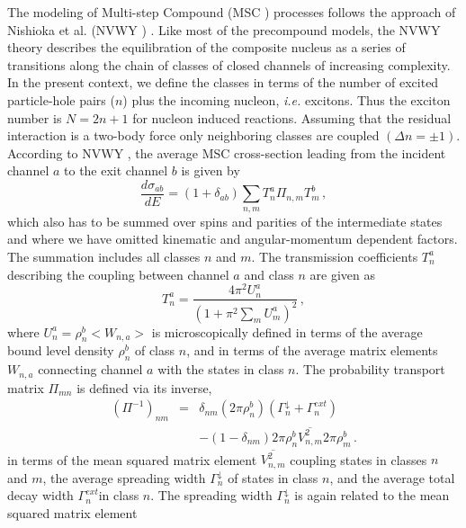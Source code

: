 The modeling of Multi-step Compound%
 (MSC%
) processes follows the approach of Nishioka et al. (NVWY%
) \cite{NVWY}. Like most of the precompound models, the NVWY
theory describes the equilibration of the composite nucleus as a series of
transitions along the chain of classes of closed channels of increasing
complexity. In the present context, we define the classes in terms of the
number of excited particle-hole pairs ($n$) plus the incoming nucleon,
\textit{i.e.} excitons. Thus the exciton number is $N=2n+1$ for nucleon
induced reactions. Assuming that the residual interaction is a two-body
force only neighboring classes are coupled $(\Delta n=\pm1)$. According to
NVWY%
, the average MSC%
 cross-section leading from the incident channel $a$ to the exit
channel $b$ is given by
\begin{equation}
\frac{d\sigma_{ab}}{dE}=(1+\delta_{ab})\sum_{n,m}T_{n}^{a}\Pi_{n,m}T_{m}^{b}%
\,,  \label{msccs}
\end{equation}
which also has to be summed over spins and parities of the intermediate
states and where we have omitted kinematic and angular-momentum dependent
factors. The summation includes all classes $n$ and $m$. The transmission
coefficients $T_{n}^{a}$ describing the coupling between channel $a$ and
class $n$ are given as
\begin{equation}
T_{n}^{a}=\frac{4\pi^{2}U_{n}^{a}}{\left(1+\pi^{2}\sum_{m}U_{m}^{a}%
\right)^{2}}\,,  \label{TlMSC}
\end{equation}
\noindent where $U_{n}^{a}=\rho_{n}^{b}<W_{n,a}>$ is microscopically defined
in terms of the average bound level density%
 $\rho_{n}^{b}$ of class $n$, and in terms of the
average matrix elements $W_{n,a}$ connecting channel $a$ with the states in
class $n$. The probability transport matrix $\Pi_{mn}$ is defined via its
inverse,
\begin{eqnarray}
(\Pi^{-1})_{nm}&=&\delta_{nm}(2\pi\rho_{n}^{b})(\Gamma_{n}^{\downarrow}+%
\Gamma_{n}^{ext})  \nonumber \\
&&-(1-\delta_{nm})2\pi\rho_{n}^{b}%
\overline{V_{n,m}^{2}}2\pi\rho_{m}^{b}\,.  \label{Pi}
\end{eqnarray}
in terms of the mean squared matrix element $\overline{V_{n,m}^{2}}$
coupling states in classes $n$ and $m$, the average spreading width $%
\Gamma_{n}^{\downarrow}$ of states in class $n$, and the average total decay
width $\Gamma_{n}^{ext}$in class $n$. The spreading width $%
\Gamma_{n}^{\downarrow}$ is again related to the mean squared matrix element
